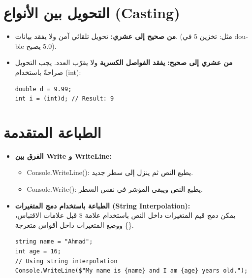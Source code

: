 \documentclass[14pt]{extarticle}
\begin{document}
\section{التحويل بين الأنواع (\textenglish{Casting})}
\begin{itemize}
    \item \textbf{من صحيح إلى عشري:} تحويل تلقائي آمن ولا يفقد بيانات. (مثل: تخزين $5$ في \textenglish{double} يصبح $5.0$).
    \item \textbf{من عشري إلى صحيح:} \textbf{يفقد الفواصل الكسرية} ولا يقرّب العدد. يجب التحويل صراحةً باستخدام \textenglish{(int)}:
\begin{boxCode}
\begin{english}
\begin{verbatim}
double d = 9.99;
int i = (int)d; // Result: 9
\end{verbatim}
\end{english}
\end{boxCode}
\end{itemize}

\clearpage
\section{الطباعة المتقدمة}
\begin{itemize}
    \item \textbf{الفرق بين \textenglish{Write} و \textenglish{WriteLine}:}
    \begin{itemize}
        \item \textenglish{Console.WriteLine()}: يطبع النص ثم ينزل إلى سطر جديد.
        \item \textenglish{Console.Write()}: يطبع النص ويبقى المؤشر في نفس السطر.
    \end{itemize}
    \item \textbf{الطباعة باستخدام دمج المتغيرات (\textenglish{String Interpolation}):} \\
    يمكن دمج قيم المتغيرات داخل النص باستخدام علامة \textenglish{\$} قبل علامات الاقتباس، ووضع المتغيرات داخل أقواس متعرجة \textenglish{\{\}}.
\begin{boxCode}
\begin{english}
\begin{verbatim}
string name = "Ahmad";
int age = 16;
// Using string interpolation
Console.WriteLine($"My name is {name} and I am {age} years old.");
\end{verbatim}
\end{english}
\end{boxCode}
\end{itemize}
\end{document}

